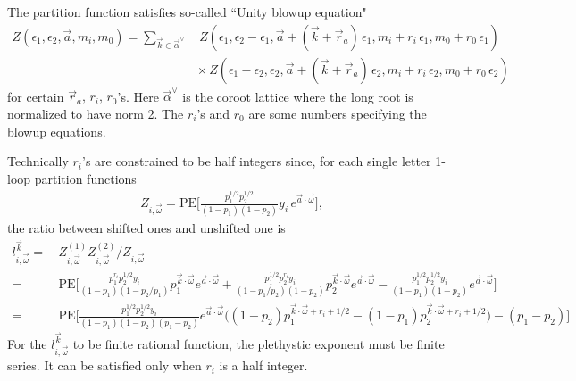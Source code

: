 \documentclass[12pt]{article}
\begin{document}
The partition function satisfies so-called ``Unity blowup equation" 
\begin{align}
Z(\epsilon_1,\epsilon_2,\vec{a},m_i, m_0)=\sum_{\vec{k}\in\vec{\alpha}^{\lor}}&\,Z(\epsilon_1,\epsilon_2-\epsilon_1,\vec{a}+(\vec{k}+\vec{r}_a)\,\epsilon_1,m_i+r_i\,\epsilon_1,m_0+r_0\,\epsilon_1)\nonumber\\
&\times\, Z(\epsilon_1-\epsilon_2,\epsilon_2,\vec{a}+(\vec{k}+\vec{r}_a)\,\epsilon_2,m_i+r_i\,\epsilon_2,m_0+r_0\,\epsilon_2)
\end{align}
for certain $\vec{r}_a,\, r_i,\,r_0$'s.
Here $\vec{\alpha}^{\lor}$ is the coroot lattice where the long root is normalized to have norm 2. The $r_i$'s and $r_0$ are some numbers specifying the blowup equations.

Technically $r_i$'s are constrained to be half integers since, for each single letter 1-loop partition functions
\begin{align}
Z_{i,\vec{\omega}}=\textrm{PE}\Bigg[\frac{p_1^{1/2}p_2^{1/2}}{(1-p_1)(1-p_2)}y_i\,e^{\vec{a}\cdot\vec{\omega}}\Bigg],
\end{align}
the ratio between shifted ones and unshifted one is
\begin{align}
l^{\vec{k}}_{i,\vec{\omega}}=&\,Z^{(1)}_{i,\vec{\omega}}Z^{(2)}_{i,\vec{\omega}}/Z_{i,\vec{\omega}}\nonumber\\
=&\,\textrm{PE}\Bigg[\frac{p_1^{r_i}p_2^{1/2}y_i}{(1-p_1)(1-p_2/p_1)}p_1^{\vec{k}\cdot\vec{\omega}}e^{\vec{a}\cdot\vec{\omega}}+\frac{p_1^{1/2}p_2^{r_i}y_i}{(1-p_1/p_2)(1-p_2)}p_2^{\vec{k}\cdot\vec{\omega}}e^{\vec{a}\cdot\vec{\omega}}-\frac{p_1^{1/2}p_2^{1/2}y_i}{(1-p_1)(1-p_2)}e^{\vec{a}\cdot\vec{\omega}}\Bigg]\nonumber\\
=&\,\textrm{PE}\Bigg[\frac{p_1^{1/2}p_2^{1/2}y_i}{(1-p_1)(1-p_2)(p_1-p_2)}e^{\vec{a}\cdot\vec{\omega}}\Big((1-p_2)p_1^{\vec{k}\cdot\vec{\omega}+r_i+1/2}-(1-p_1)p_2^{\vec{k}\cdot\vec{\omega}+r_i+1/2}\Big)-(p_1-p_2)\Bigg]
\end{align}
For the $l^{\vec{k}}_{i,\vec{\omega}}$ to be finite rational function, the plethystic exponent must be finite series. It can be satisfied only when $r_i$ is a half integer.
\end{document}
